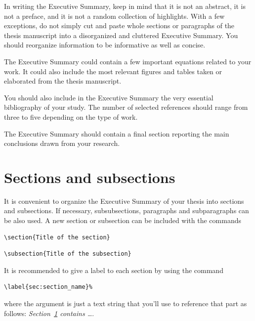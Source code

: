 \documentclass[11pt,a4paper,twocolumn]{article}
\begin{document}
In writing the Executive Summary, keep in mind that it is not an abstract, it is not a preface,
and it is not a random collection of highlights.
With a few exceptions, do not simply cut and paste whole sections or paragraphs of the thesis manuscript
into a disorganized and cluttered Executive Summary.
You should reorganize information to be informative as well as concise.

The Executive Summary could contain a few important equations related to your work.
It could also include the most relevant figures and tables taken or elaborated from the thesis manuscript.

You should also include in the Executive Summary the very essential bibliography of your study.
The number of selected references should range from three to five depending on the type of work.

The Executive Summary should contain a final section reporting the main conclusions drawn from your research.

\section{Sections and subsections}
\label{sec:sec_and_subsec}
It is convenient to organize the Executive Summary of your thesis into sections and subsections. 
If necessary, subsubsections, paragraphs and subparagraphs can be also used. 
A new section or subsection can be included  with the commands
\begin{verbatim}
\section{Title of the section}
\end{verbatim}
\begin{verbatim}
\subsection{Title of the subsection}
\end{verbatim}
It is recommended to give a label to each section by using the command
\begin{verbatim}
\label{sec:section_name}%
\end{verbatim}
where the argument is just a text string that you'll use to reference that part
as follows: \textit{Section~\ref{sec:sec_and_subsec} contains   \dots}.\\

\end{document}
